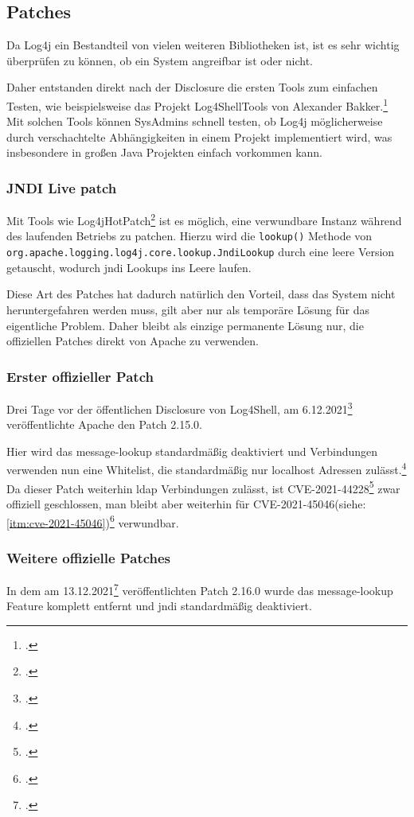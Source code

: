 
\subsection{Patches}\label{subsec:patches}
Da Log4j ein Bestandteil von vielen weiteren Bibliotheken ist, ist es sehr wichtig überprüfen zu können, ob ein System angreifbar ist oder nicht.

Daher entstanden direkt nach der Disclosure die ersten Tools zum einfachen Testen, wie beispielsweise das Projekt Log4ShellTools von Alexander Bakker.\footcite{log4ShellTools}
Mit solchen Tools können SysAdmins schnell testen, ob Log4j möglicherweise durch verschachtelte Abhängigkeiten in einem Projekt implementiert wird, was insbesondere in großen Java Projekten einfach vorkommen kann.

\subsubsection{JNDI Live patch}
Mit Tools wie Log4jHotPatch\footcite{hotpatch} ist es möglich, eine verwundbare Instanz während des laufenden Betriebs zu patchen.
Hierzu wird die \verb|lookup()| Methode von \verb|org.apache.logging.log4j.core.lookup.JndiLookup| durch eine leere Version getauscht, wodurch \gls{jndi} Lookups ins Leere laufen.

Diese Art des Patches hat dadurch natürlich den Vorteil, dass das System nicht heruntergefahren werden muss, gilt aber nur als temporäre Lösung für das eigentliche Problem.
Daher bleibt als einzige permanente Lösung nur, die offiziellen Patches direkt von Apache zu verwenden.

\subsubsection{Erster offizieller Patch}
Drei Tage vor der öffentlichen Disclosure von Log4Shell, am 6.12.2021\footcite{log4jChange} veröffentlichte Apache den Patch 2.15.0.

Hier wird das message-lookup standardmäßig deaktiviert und  Verbindungen verwenden nun eine Whitelist, die standardmäßig nur localhost Adressen zulässt.\footcite{log4jSecurity}
Da dieser Patch weiterhin \gls{ldap} Verbindungen zulässt, ist CVE-2021-44228\footcite{44228} zwar offiziell geschlossen, man bleibt aber weiterhin für CVE-2021-45046(siehe: \ref{itm:cve-2021-45046})\footcite{45046} verwundbar.

\subsubsection{Weitere offizielle Patches}
In dem am 13.12.2021\footcite{log4jChange} veröffentlichten Patch 2.16.0 wurde das message-lookup Feature komplett entfernt und \gls{jndi} standardmäßig deaktiviert.

